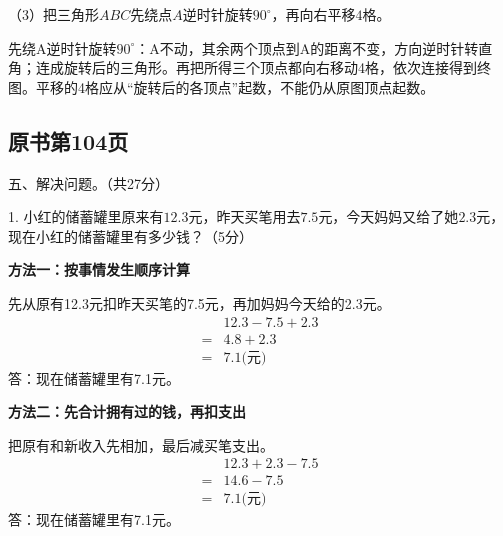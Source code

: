 （3）把三角形\(ABC\)先绕点\(A\)逆时针旋转\(90^\circ\)，再向右平移\(4\)格。\par
{}
\begin{BookAnswer}
先绕A逆时针旋转\(90^\circ\)：A不动，其余两个顶点到A的距离不变，方向逆时针转直角；连成旋转后的三角形。再把所得三个顶点都向右移动4格，依次连接得到终图。平移的4格应从“旋转后的各顶点”起数，不能仍从原图顶点起数。
\end{BookAnswer}



\subsection*{原书第104页}

五、解决问题。（共27分）\par 1. 小红的储蓄罐里原来有\(12.3\)元，昨天买笔用去\(7.5\)元，今天妈妈又给了她\(2.3\)元，现在小红的储蓄罐里有多少钱？（5分）\par
\begin{BookAnswer}
\textbf{方法一：按事情发生顺序计算}\par 先从原有12.3元扣昨天买笔的7.5元，再加妈妈今天给的2.3元。\[\begin{aligned} &12.3-7.5+2.3\\ ={}&4.8+2.3\\ ={}&7.1\text{(元)}\end{aligned}\]答：现在储蓄罐里有7.1元。\par \textbf{方法二：先合计拥有过的钱，再扣支出}\par 把原有和新收入先相加，最后减买笔支出。\[\begin{aligned} &12.3+2.3-7.5\\ ={}&14.6-7.5\\ ={}&7.1\text{(元)}\end{aligned}\]答：现在储蓄罐里有7.1元。\par
\end{BookAnswer}

